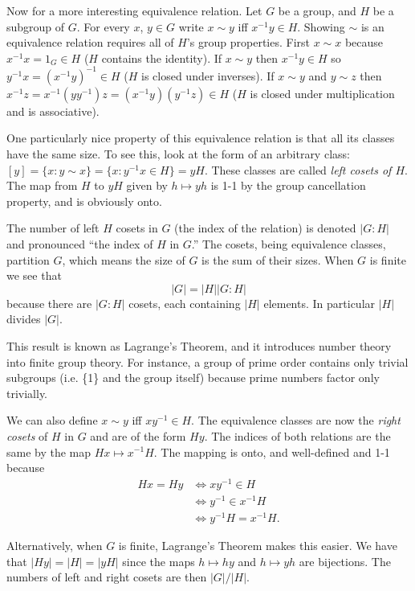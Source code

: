 \documentclass[letterpaper]{article}
\begin{document}
Now for a more interesting equivalence relation. Let $G$ be a group, and $H$ be a subgroup of $G$. For every $x$, $y \in G$ write $x \sim y$ iff $x^{-1}y \in H$. Showing $\sim$ is an equivalence relation requires all of $H$'s group properties. First $x \sim x$ because $x^{-1}x = 1_G \in H$ ($H$ contains the identity). If $x \sim y$ then $x^{-1}y \in H$ so $y^{-1}x = (x^{-1}y)^{-1} \in H$ ($H$ is closed under inverses). If $x \sim y$ and $y \sim z$ then $x^{-1}z = x^{-1}(yy^{-1})z = (x^{-1}y)(y^{-1}z) \in H$ ($H$ is closed under multiplication and is associative).

One particularly nice property of this equivalence relation is that all its classes have the same size. To see this, look at the form of an arbitrary class: $\left[y\right] = \{x: y \sim x\} = \{x: y^{-1}x \in H\} = yH$. These classes are called \emph{left cosets of $H$}. The map from $H$ to $yH$ given by $h \mapsto yh$ is 1-1 by the group cancellation property, and is obviously onto.

The number of left $H$ cosets in $G$ (the index of the relation) is denoted $|G : H|$ and pronounced ``the index of $H$ in $G$.'' The cosets, being equivalence classes, partition $G$, which means the size of $G$ is the sum of their sizes.  When $G$ is finite we see that \[|G| = |H||G : H|\] because there are $|G : H|$ cosets, each containing $|H|$ elements. In particular $|H|$ divides $|G|$.

This result is known as Lagrange's Theorem, and it introduces number theory into finite group theory. For instance, a group of prime order contains only trivial subgroups (i.e. \{1\} and the group itself) because prime numbers factor only trivially.

We can also define $x \sim y$ iff $xy^{-1} \in H$. The equivalence classes are now the \emph{right cosets} of $H$ in $G$ and are of the form $Hy$.  The indices of both relations are the same by the map $Hx \mapsto x^{-1}H$. The mapping is onto, and well-defined and 1-1 because
\begin{align*}
Hx = Hy &\Longleftrightarrow xy^{-1} \in H\\
        &\Longleftrightarrow y^{-1} \in x^{-1}H\\
		&\Longleftrightarrow y^{-1}H = x^{-1}H.
\end{align*}

Alternatively, when $G$ is finite, Lagrange's Theorem makes this easier. We have that $|Hy| = |H| = |yH|$ since the maps $h \mapsto hy$ and $h \mapsto yh$ are bijections. The numbers of left  and right cosets are then $|G|/|H|$.
\end{document}
